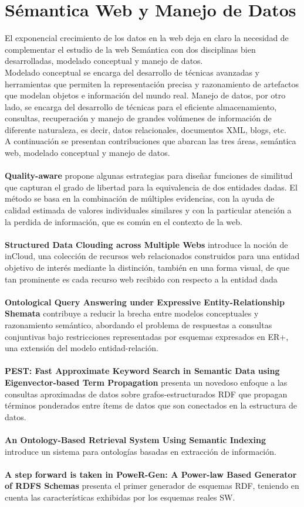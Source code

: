 \documentclass[10pt,a4paper]{article}
\begin{document}
\section{Sémantica Web y Manejo de Datos}
El exponencial crecimiento de los datos en la web deja en claro la necesidad de complementar el estudio de la web Semántica con dos disciplinas bien desarrolladas, modelado conceptual y manejo de datos. 
\\
Modelado conceptual se encarga del desarrollo de técnicas avanzadas y herramientas que permiten la representación precisa y razonamiento de artefactos que modelan objetos e información del mundo real. Manejo de datos, por otro lado, se encarga del desarrollo de técnicas para el eficiente almacenamiento, consultas, recuperación y manejo de grandes volúmenes de información de diferente naturaleza, es decir, datos relacionales, documentos XML, blogs, etc.
\\
A continuación se presentan contribuciones que abarcan las tres áreas, semántica web, modelado conceptual y manejo de datos.
\\\\
\textbf{Quality-aware} propone algunas estrategias para diseñar funciones de similitud que capturan el grado de libertad para la equivalencia de dos entidades dadas. El método se basa en la combinación de múltiples evidencias, con la ayuda de calidad estimada de valores individuales similares y con la particular atención a la perdida de información, que es común en el contexto de la web. 
\\\\
\textbf{Structured Data Clouding across Multiple Webs} introduce la noción de inCloud, una colección de recursos web relacionados construidos para una entidad objetivo de interés mediante la distinción, también en una forma visual, de que tan prominente es cada recurso web recibido con respecto a la entidad dada
\\\\
\textbf{Ontological Query Answering under Expressive Entity-Relationship Shemata} contribuye a reducir la brecha entre modelos conceptuales y razonamiento semántico, abordando el problema de respuestas a consultas conjuntivas bajo restricciones representadas por esquemas expresados en ER+, una extensión del modelo entidad-relación.
\\\\
\textbf{PEST: Fast Approximate Keyword Search in Semantic Data using Eigenvector-based Term Propagation} presenta un novedoso enfoque a las consultas aproximadas de datos sobre grafos-estructurados RDF que propagan términos ponderados entre ítems de datos que son conectados en la estructura de datos.
\\\\
\textbf{An Ontology-Based Retrieval System Using Semantic Indexing} introduce un sistema para ontologías basadas en extracción de información.
\\\\
\textbf{A step forward is taken in PoweR-Gen: A Power-law Based Generator of RDFS Schemas} presenta el primer generador de esquemas RDF, teniendo en cuenta las características exhibidas por los esquemas reales SW.
\end{document}

